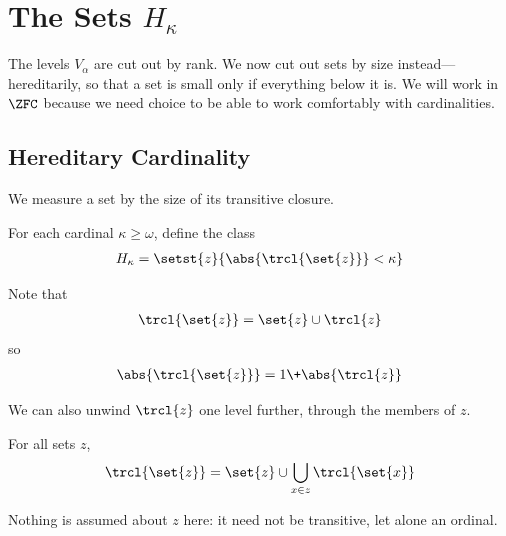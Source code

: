 \section{The Sets $H_{\kappa}$}

The levels $V_{\alpha}$ are cut out by rank. We now cut out sets by size instead---hereditarily, so that a set is small only if everything below it is. We will work in $\ZFC$ because we need choice to be able to work comfortably with cardinalities.

\subsection{Hereditary Cardinality}

We measure a set by the size of its transitive closure.

\begin{boxdefinition}[$H_{\kappa}$]
    For each cardinal $\kappa \geq \omega$, define the class
    \begin{align*}
        H_{\kappa} = \setst{z}{\abs{\trcl{\set{z}}} < \kappa}
    \end{align*}
\end{boxdefinition}

Note that
\begin{align*}
    \trcl{\set{z}} = \set{z} \cup \trcl{z}
\end{align*}
so
\begin{align*}
    \abs{\trcl{\set{z}}} = 1 \+ \abs{\trcl{z}}
\end{align*}

We can also unwind $\trcl{z}$ one level further, through the members of $z$.

\begin{boxproposition}
    For all sets $z$,
    \begin{align*}
        \trcl{\set{z}} = \set{z} \cup \bigcup_{x \in z} \trcl{\set{x}}
    \end{align*}
\end{boxproposition}

Nothing is assumed about $z$ here: it need not be transitive, let alone an ordinal.

